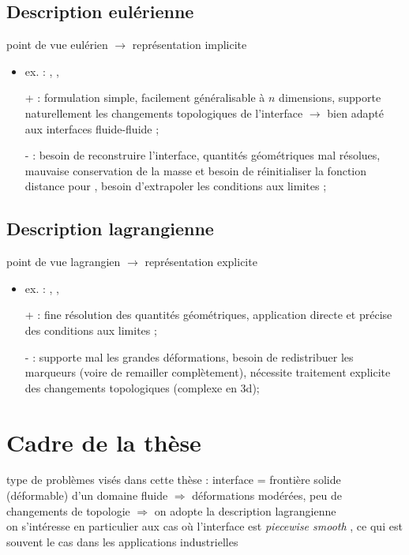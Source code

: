 \subsection{Description eulérienne}
point de vue eulérien $\to$ représentation implicite
\begin{itemize}
	\item ex. :  \cite{sethian1999},  \cite{gueyffier1999}, \etc
	\item[+] : formulation simple, facilement généralisable à $n$ dimensions, supporte naturellement les changements topologiques de l'interface $\to$ bien adapté aux interfaces fluide-fluide ;
	\item[-] : besoin de reconstruire l'interface, quantités géométriques mal résolues, mauvaise conservation de la masse et besoin de réinitialiser la fonction distance pour , besoin d'extrapoler les conditions aux limites ;
\end{itemize}
	
\subsection{Description lagrangienne}
point de vue lagrangien $\to$ représentation explicite
\begin{itemize}
	\item ex. :  \cite{popinet1999, tryggvason2001},  \cite{jiao2007}, \etc
	\item[+] : fine résolution des quantités géométriques, application directe et précise des conditions aux limites ;
	\item[-] : supporte mal les grandes déformations, besoin de redistribuer les marqueurs (voire de remailler complètement), nécessite traitement explicite des changements topologiques (complexe en 3d);
\end{itemize}

\section{Cadre de la thèse}
type de problèmes visés dans cette thèse : interface = frontière solide (déformable) d'un domaine fluide $\Rightarrow$ déformations modérées, peu de changements de topologie $\Rightarrow$ on adopte la description lagrangienne\\
on s'intéresse en particulier aux cas où l'interface est \emph{piecewise smooth}%
, ce qui est souvent le cas dans les applications industrielles\\

